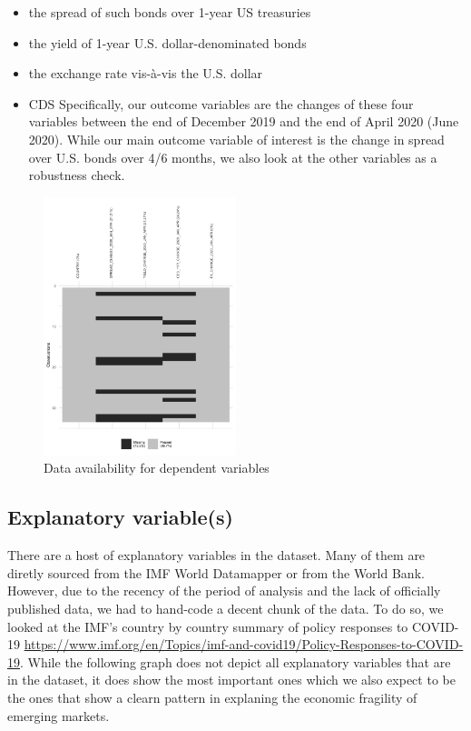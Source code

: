 \documentclass[11pt,]{article}
\providecommand{\tightlist}{%
\setlength{\itemsep}{0pt}\setlength{\parskip}{0pt}}
\begin{document}
\begin{itemize}
\tightlist
\item
  the spread of such bonds over 1-year US treasuries
\item
  the yield of 1-year U.S. dollar-denominated bonds
\item
  the exchange rate vis-à-vis the U.S. dollar
\item
  CDS Specifically, our outcome variables are the changes of these four
  variables between the end of December 2019 and the end of April 2020
  (June 2020). While our main outcome variable of interest is the change
  in spread over U.S. bonds over 4/6 months, we also look at the other
  variables as a robustness check.
\end{itemize}

\begin{figure}
\centering
\includegraphics[width=0.5\textwidth,height=\textheight]{reportfigures/missingdata_dependentvariable.png}
\caption{Data availability for dependent variables}
\end{figure}

\hypertarget{explanatory-variables}{%
\subsection{Explanatory variable(s)}\label{explanatory-variables}}

There are a host of explanatory variables in the dataset. Many of them
are diretly sourced from the IMF World Datamapper or from the World
Bank. However, due to the recency of the period of analysis and the lack
of officially published data, we had to hand-code a decent chunk of the
data. To do so, we looked at the IMF's country by country summary of
policy responses to COVID-19
\url{https://www.imf.org/en/Topics/imf-and-covid19/Policy-Responses-to-COVID-19}.
While the following graph does not depict all explanatory variables that
are in the dataset, it does show the most important ones which we also
expect to be the ones that show a clearn pattern in explaning the
economic fragility of emerging markets.
\end{document}
